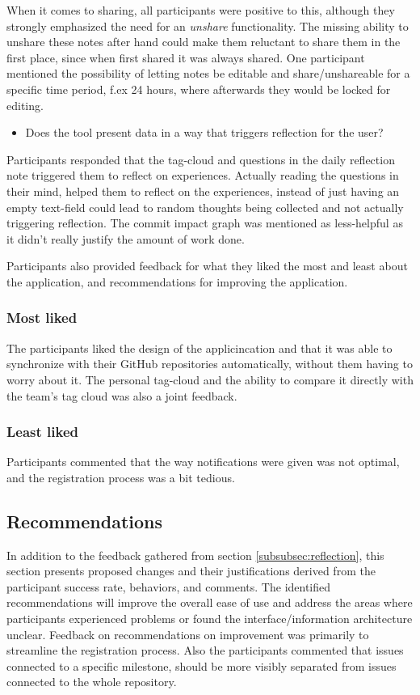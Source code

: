 When it comes to sharing, all participants were positive to this, although they strongly emphasized the need for an \emph{unshare} functionality. The missing ability to unshare these notes after hand could make them reluctant to share them in the first place, since when first shared it was always shared. One participant mentioned the possibility of letting notes be editable and share/unshareable for a specific time period, f.ex 24 hours, where afterwards they would be locked for editing.  
\begin{itemize}
	\item Does the tool present data in a way that triggers reflection for the user?
\end{itemize}
Participants responded that the tag-cloud and questions in the daily reflection note triggered them to reflect on experiences. Actually reading the questions in their mind, helped them to reflect on the experiences, instead of just having an empty text-field could lead to random thoughts being collected and not actually triggering reflection. The commit impact graph was mentioned as less-helpful as it didn't really justify the amount of work done. 
	
Participants also provided feedback for what they liked the most and least about the application, and recommendations for improving the application. 
\subsubsection*{Most liked}
The participants liked the design of the applicincation and that it was able to synchronize with their GitHub repositories automatically, without them having to worry about it. The personal tag-cloud and the ability to compare it directly with the team's tag cloud was also a joint feedback.
\subsubsection*{Least liked}
Participants commented that the way notifications were given was not optimal, and the registration process was a bit tedious.
\subsection{Recommendations}
In addition to the feedback gathered from section \ref{subsubsec:reflection}, this section presents proposed changes and their justifications derived from the participant success rate, behaviors, and comments. The identified recommendations will improve the overall ease of use and address the areas where participants experienced problems or found the interface/information architecture unclear.
Feedback on recommendations on improvement was primarily to streamline the registration process. Also the participants commented that issues connected to a specific milestone, should be more visibly separated from issues connected to the whole repository. 

